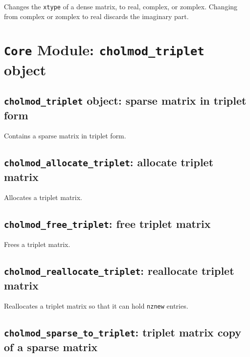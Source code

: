 \documentclass[11pt]{article}
\begin{document}

Changes the {\tt xtype} of a dense matrix, to real, complex, or zomplex.
Changing from complex or zomplex to real discards the imaginary part.

\newpage \section{{\tt Core} Module: {\tt cholmod\_triplet} object}
\label{cholmod_triplet}

\subsection{{\tt cholmod\_triplet} object: sparse matrix in triplet form}


Contains a sparse matrix in triplet form.

\subsection{{\tt cholmod\_allocate\_triplet}: allocate triplet matrix}


Allocates a triplet matrix.

\subsection{{\tt cholmod\_free\_triplet}: free triplet matrix}


Frees a triplet matrix.

\newpage \subsection{{\tt cholmod\_reallocate\_triplet}: reallocate triplet matrix}


Reallocates a triplet matrix so that it can hold {\tt nznew} entries.

\subsection{{\tt cholmod\_sparse\_to\_triplet}: triplet matrix copy of a sparse matrix}
\end{document}
